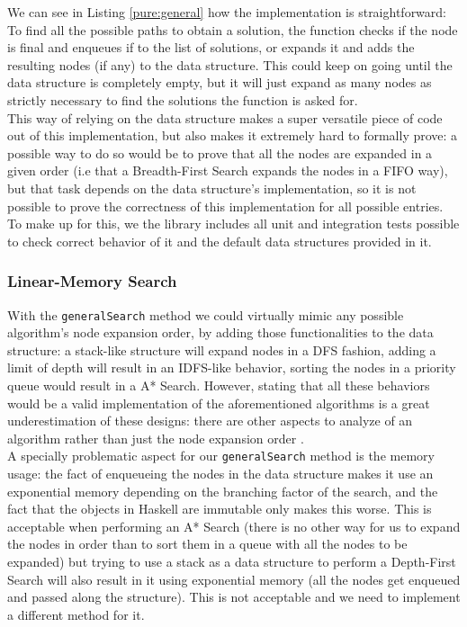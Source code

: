 We can see in Listing \ref{pure:general} how the implementation is
straightforward: To find all the possible paths to obtain a solution, the
function checks if the node is final and enqueues if to the list of solutions,
or expands it and adds the resulting nodes (if any) to the data structure. This
could keep on going until the data structure is completely empty, but it will
just expand as many nodes as strictly necessary to find the solutions the
function is asked for.\\

This way of relying on the data structure makes a super versatile piece of code
out of this implementation, but also makes it extremely hard to formally prove:
a possible way to do so would be to prove that all the nodes are expanded in a
given order (i.e that a Breadth-First Search expands the nodes in a FIFO way),
but that task depends on the data structure's implementation, so it is not
possible to prove the correctness of this implementation for all possible
entries. To make up for this, we the library includes all unit and integration
tests possible to check correct behavior of it and the default data structures
provided in it.\\

\subsubsection{Linear-Memory Search}

With the \texttt{generalSearch} method we could virtually mimic any possible
algorithm's node expansion order, by adding those functionalities to the data
structure: a stack-like structure will expand nodes in a DFS fashion, adding a
limit of depth will result in an IDFS-like behavior, sorting the nodes in a
priority queue would result in a A* Search. However, stating that all these
behaviors would be a valid implementation of the aforementioned algorithms is a
great underestimation of these designs: there are other aspects to analyze of
an algorithm rather than just the node expansion order
\cite{korf-2014-correct}.\\

A specially problematic aspect for our \texttt{generalSearch} method is the
memory usage: the fact of enqueueing the nodes in the data structure makes it
use an exponential memory depending on the branching factor of the search, and
the fact that the objects in Haskell are immutable only makes this worse. This
is acceptable when performing an A* Search (there is no other way for us to
expand the nodes in order than to sort them in a queue with all the nodes to be
expanded) but trying to use a stack as a data structure to perform a
Depth-First Search will also result in it using exponential memory (all the
nodes get enqueued and passed along the structure). This is not acceptable and
we need to implement a different method for it.\\

